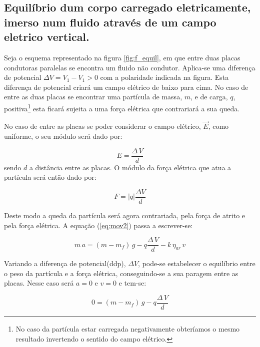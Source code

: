 \documentclass[a4paper,twoside,12pt]{article}      %
\begin{document}
\begin{multicols}{2}

\subsection{\sf Equilíbrio dum corpo carregado eletricamente, imerso num fluido através de um campo eletrico vertical.}

Seja o esquema representado na figura \ref{fig:f_equil}, em que entre duas placas condutoras paralelas se encontra um fluido não condutor. Aplica-se uma diferença de potencial $\Delta V = V_1 -V_1 > 0$ com a polaridade indicada na figura. Esta diferença de potencial criará um campo elétrico de baixo para cima. No caso de entre as duas placas se encontrar uma partícula de massa, $m$, e de carga, $q$, positiva\footnote{No caso da partícula estar carregada negativamente obteríamos o mesmo resultado invertendo o sentido do campo elétrico.} esta ficará sujeita a uma força elétrica que contrariará a sua queda.

No caso de entre as placas se poder considerar o campo elétrico, $\vec{E}$, como uniforme, o seu módulo será dado por:


\begin{equation*}
	E = \frac{\Delta\, V}{d}
\end{equation*}
sendo $d$ a distância entre as placas. O módulo da força elétrica que atua a partícula será então  dado por: 

\begin{equation*}
	F = |q| \frac{\Delta V}{d}
\end{equation*}

Deste modo a queda da partícula será agora contrariada, pela força de atrito e pela força elétrica. A equação (\ref{eq:mov2}) passa a escrever-se:

\begin{equation}
	\label{eq:mov3}
	m\,a = (m - m_f)\,g  - q \frac{\Delta\, V}{d} - k  \, \eta_{ar} \, v
\end{equation}

Variando a diferença de potencial(ddp), $\Delta V$, pode-se estabelecer o equilíbrio entre o peso da partícula e a força elétrica, conseguindo-se a sua paragem entre as placas. Nesse caso será $a=0$ e $v=0$ e tem-se:

\begin{equation}
	\label{eq:equil}
	0 = (m - m_f)\,g  - q \frac{\Delta\, V}{d} 
\end{equation}


\end{multicols}
\end{document}
